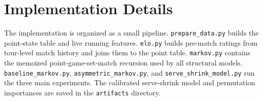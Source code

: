 \documentclass{article} %
\begin{document}
\appendix
\section{Implementation Details}

The implementation is organized as a small pipeline. \texttt{prepare\_data.py}
builds the point-state table and live running features.
\texttt{elo.py} builds pre-match ratings from tour-level match history and
joins them to the point table. \texttt{markov.py} contains the memoized
point-game-set-match recursion used by all structural models.
\texttt{baseline\_markov.py}, \texttt{asymmetric\_markov.py}, and
\texttt{serve\_shrink\_model.py} run the three main experiments. The calibrated
serve-shrink model and permutation importances are saved in the
\texttt{artifacts} directory.
\end{document}
